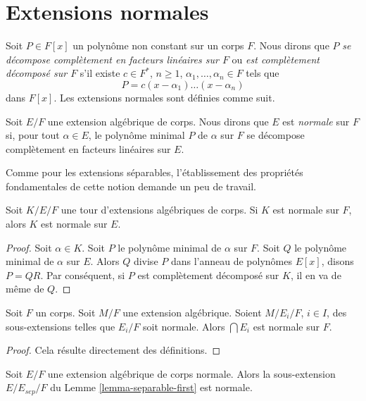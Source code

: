 \section{Extensions normales}
\label{section-normal}

\noindent
Soit $P \in F[x]$ un polynôme non constant sur un corps $F$. Nous dirons que $P$
{\it se décompose complètement en facteurs linéaires sur $F$} ou
{\it est complètement décomposé sur $F$} s'il existe
$c \in F^*$, $n \geq 1$, $\alpha_1, \ldots, \alpha_n \in F$ tels que
$$
P = c(x - \alpha_1) \ldots (x - \alpha_n)
$$
dans $F[x]$. Les extensions normales sont définies comme suit.

\begin{definition}
\label{definition-normal}
Soit $E/F$ une extension algébrique de corps. Nous dirons que $E$ est {\it normale}
sur $F$ si, pour tout $\alpha \in E$, le polynôme minimal $P$
de $\alpha$ sur $F$ se décompose complètement en facteurs linéaires sur $E$.
\end{definition}

\noindent
Comme pour les extensions séparables, l'établissement des propriétés
fondamentales de cette notion demande un peu de travail.

\begin{lemma}
\label{lemma-normal-goes-up}
Soit $K/E/F$ une tour d'extensions algébriques de corps.
Si $K$ est normale sur $F$, alors $K$ est normale sur $E$.
\end{lemma}

\begin{proof}
Soit $\alpha \in K$. Soit $P$ le polynôme minimal de $\alpha$ sur $F$.
Soit $Q$ le polynôme minimal de $\alpha$ sur $E$.
Alors $Q$ divise $P$ dans l'anneau de polynômes $E[x]$, disons $P = QR$.
Par conséquent, si $P$ est complètement décomposé sur $K$, il en va de même de $Q$.
\end{proof}

\begin{lemma}
\label{lemma-intersect-normal}
Soit $F$ un corps. Soit $M/F$ une extension algébrique. Soient
$M/E_i/F$, $i \in I$, des sous-extensions telles que
$E_i/F$ soit normale. Alors $\bigcap E_i$ est normale sur $F$.
\end{lemma}

\begin{proof}
Cela résulte directement des définitions.
\end{proof}

\begin{lemma}
\label{lemma-separable-first-normal}
Soit $E/F$ une extension algébrique de corps normale. Alors la sous-extension
$E/E_{sep}/F$ du Lemme \ref{lemma-separable-first} est normale.
\end{lemma}

